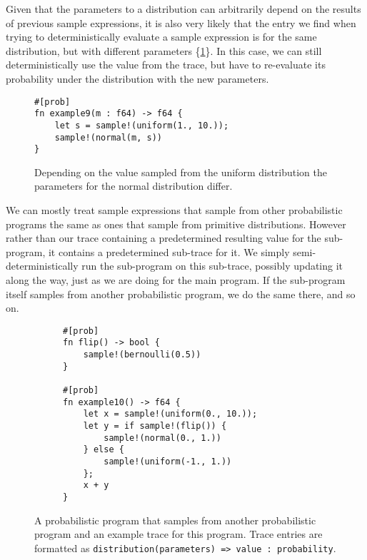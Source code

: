 Given that the parameters to a distribution can arbitrarily depend on the results of previous sample expressions, it is also very likely that the entry we find when trying to deterministically evaluate a sample expression is for the same distribution, but with different parameters \{\ref{example9}\}. In this case, we can still deterministically use the value from the trace, but have to re-evaluate its probability under the distribution with the new parameters.

\begin{figure}[h]
\begin{lstlisting}
#[prob]
fn example9(m : f64) -> f64 {
    let s = sample!(uniform(1., 10.));
    sample!(normal(m, s))
}
\end{lstlisting}
\caption{Depending on the value sampled from the uniform distribution the parameters for the normal distribution differ.}
\label{example9}
\end{figure}

We can mostly treat sample expressions that sample from other probabilistic programs the same as ones that sample from primitive distributions. However rather than our trace containing a predetermined resulting value for the sub-program, it contains a predetermined sub-trace for it. We simply semi-deterministically run the sub-program on this sub-trace, possibly updating it along the way, just as we are doing for the main program. If the sub-program itself samples from another probabilistic program, we do the same there, and so on.

\begin{figure}[h]
\begin{subfigure}{0.5\textwidth}
\begin{lstlisting}
#[prob]
fn flip() -> bool {
    sample!(bernoulli(0.5))
}

#[prob]
fn example10() -> f64 {
    let x = sample!(uniform(0., 10.));
    let y = if sample!(flip()) {
        sample!(normal(0., 1.))
    } else {
        sample!(uniform(-1., 1.))
    };
    x + y
}
\end{lstlisting}
\end{subfigure}
\begin{subfigure}{0.55\textwidth}
\end{subfigure}
\caption{A probabilistic program that samples from another probabilistic program and an example trace for this program. Trace entries are formatted as \lstinline{distribution(parameters) => value : probability}.}
\label{example10}
\end{figure}

